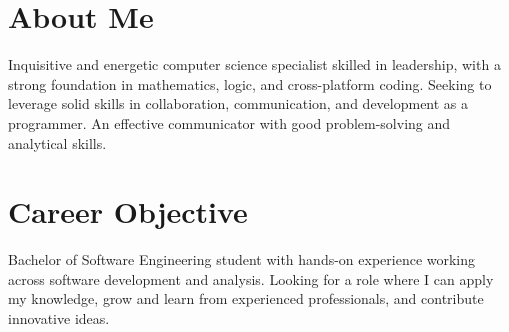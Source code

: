 \section*{About Me}

Inquisitive and energetic computer science specialist skilled in leadership, with a strong foundation in mathematics, logic, and cross-platform coding. Seeking to leverage solid skills in collaboration, communication, and development as a programmer. An effective communicator with good problem-solving and analytical skills. 

\section*{Career Objective}

Bachelor of Software Engineering student with hands-on experience working across software development and analysis. Looking for a role where I can apply my knowledge, grow and learn from experienced professionals, and contribute innovative ideas.